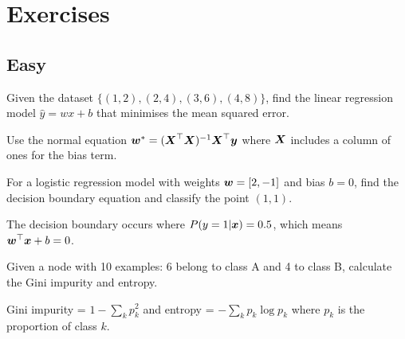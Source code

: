 
\section*{Exercises}

\subsection*{Easy}

\begin{exercisebox}[easy]
\begin{problem}
\label{prob:linear-regression-basics}
Given the dataset $\{(1, 2), (2, 4), (3, 6), (4, 8)\}$, find the linear regression model $\hat{y} = wx + b$ that minimises the mean squared error.
\end{problem}
\begin{hintbox}
Use the normal equation $\boldsymbol{w}^* = (\boldsymbol{X}^\top \boldsymbol{X})^{-1} \boldsymbol{X}^\top \boldsymbol{y}$ where $\boldsymbol{X}$ includes a column of ones for the bias term.
\end{hintbox}
\end{exercisebox}


\begin{exercisebox}[easy]
\begin{problem}
\label{prob:logistic-decision-boundary}
For a logistic regression model with weights $\boldsymbol{w} = [2, -1]$ and bias $b = 0$, find the decision boundary equation and classify the point $(1, 1)$.
\end{problem}
\begin{hintbox}
The decision boundary occurs where $P(y=1|\boldsymbol{x}) = 0.5$, which means $\boldsymbol{w}^\top \boldsymbol{x} + b = 0$.
\end{hintbox}
\end{exercisebox}


\begin{exercisebox}[easy]
\begin{problem}
\label{prob:decision-tree-splitting}
Given a node with 10 examples: 6 belong to class A and 4 to class B, calculate the Gini impurity and entropy.
\end{problem}
\begin{hintbox}
Gini impurity = $1 - \sum_{k} p_k^2$ and entropy = $-\sum_{k} p_k \log p_k$ where $p_k$ is the proportion of class $k$.
\end{hintbox}
\end{exercisebox}


